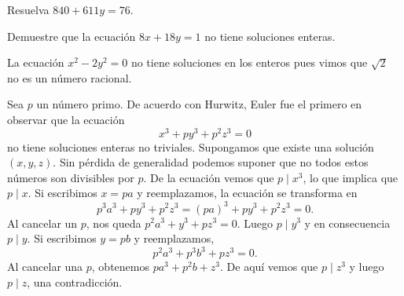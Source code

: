 %

\begin{exercise}
	Resuelva $840+611y=76$. 
\end{exercise}

\begin{exercise}
	Demuestre que la ecuación $8x+18y=1$ no tiene soluciones enteras.
\end{exercise}

\begin{example}
	La ecuación $x^2-2y^2=0$ no tiene soluciones en los enteros pues vimos que
	$\sqrt{2}$ no es un número racional. 
\end{example}

\begin{example}
	Sea $p$ un número primo.  De acuerdo con Hurwitz, Euler fue el primero en
	observar que la ecuación
	\[
		x^3+py^3+p^2z^3=0
	\]
	no tiene soluciones enteras no triviales. Supongamos que existe una
	solución $(x,y,z)$. Sin pérdida de generalidad podemos suponer que no todos
	estos números son divisibles por $p$. De la ecuación vemos que $p\mid x^3$,
	lo que implica que $p\mid x$. Si escribimos $x=pa$ y reemplazamos, la
	ecuación se transforma en 
	\[
		p^3a^3+py^3+p^2z^3=(pa)^3+py^3+p^2z^3=0.
	\]
	Al cancelar un $p$, nos queda $p^2a^3+y^3+pz^3=0$. Luego $p\mid y^3$ y en consecuencia $p\mid y$. Si escribimos
	$y=pb$ y reemplazamos, 
	\[
		p^2a^3+p^3b^3+pz^3=0.
	\]
	Al cancelar una $p$, obtenemos $pa^3+p^2b+z^3$. De aquí vemos que $p\mid
	z^3$ y luego $p\mid z$, una contradicción.
\end{example}

